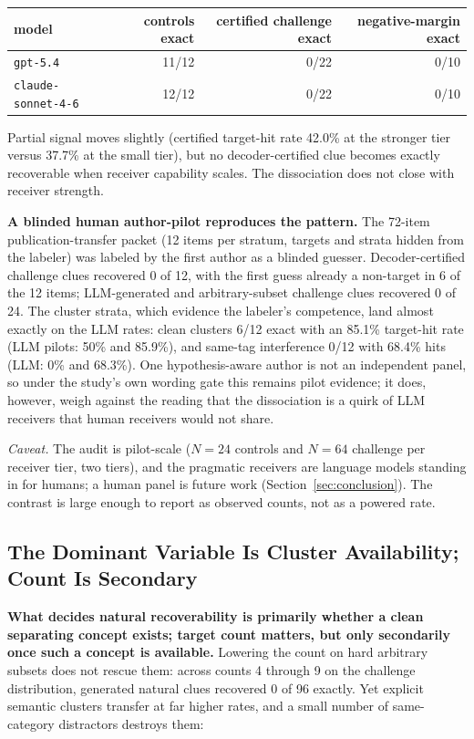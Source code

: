 \documentclass[11pt]{article}
\begin{document}
\begin{center}
\begin{tabular}{lrrr}
\toprule
model & controls exact & certified challenge exact & negative-margin exact \\
\midrule
\texttt{gpt-5.4}        & 11/12 & 0/22 & 0/10 \\
\texttt{claude-sonnet-4-6} & 12/12 & 0/22 & 0/10 \\
\bottomrule
\end{tabular}
\end{center}

Partial signal moves slightly (certified target-hit rate 42.0\% at the stronger
tier versus 37.7\% at the small tier), but no decoder-certified clue becomes
exactly recoverable when receiver capability scales. The dissociation does not
close with receiver strength.

\textbf{A blinded human author-pilot reproduces the pattern.} The 72-item
publication-transfer packet (12 items per stratum, targets and strata hidden from
the labeler) was labeled by the first author as a blinded guesser.
Decoder-certified challenge clues recovered 0 of 12, with the first guess already
a non-target in 6 of the 12 items; LLM-generated and arbitrary-subset challenge
clues recovered 0 of 24. The cluster strata, which evidence the labeler's competence, land
almost exactly on the LLM rates:
clean clusters 6/12 exact with an 85.1\% target-hit rate (LLM pilots: 50\% and
85.9\%), and same-tag interference 0/12 with 68.4\% hits (LLM: 0\% and 68.3\%).
One hypothesis-aware author is not an independent
panel, so under the study's own wording gate this remains pilot evidence; it does,
however, weigh against the reading that the dissociation is a quirk of LLM
receivers that human receivers would not share.

\emph{Caveat.} The audit is pilot-scale ($N = 24$ controls and $N = 64$ challenge
per receiver tier, two tiers), and the pragmatic receivers are language models
standing in for humans; a human panel is future work
(Section~\ref{sec:conclusion}). The contrast is large enough to report as
observed counts, not as a powered rate.

\subsection{The Dominant Variable Is Cluster Availability; Count Is Secondary}

\textbf{What decides natural recoverability is primarily whether a clean
separating concept exists; target count matters, but only secondarily once such a
concept is available.} Lowering the count on hard arbitrary subsets does not
rescue them: across counts 4 through 9 on the challenge distribution, generated
natural clues recovered 0 of 96 exactly. Yet explicit semantic clusters transfer
at far higher rates, and a small number of same-category distractors destroys
them:
\end{document}
